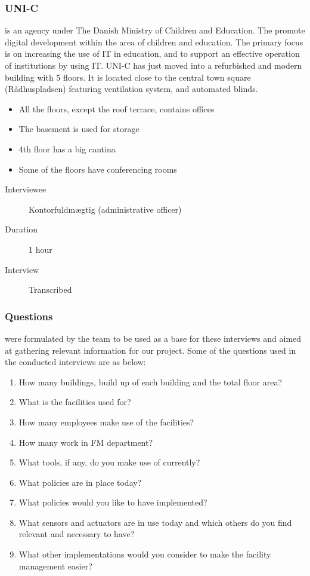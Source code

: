 \subsubsection{UNI-C} is an agency under The Danish Ministry of Children and Education. The promote digital development within the area of children and education. The primary focus is on increasing the use of IT in education, and to support an effective operation of institutions by using IT. UNI-C has just moved into a refurbished and modern building with 5 floors. It is located close to the central town square (R\aa dhuspladsen) featuring ventilation system, and automated blinds.
\begin{itemize}
	\item All the floors, except the roof terrace, contains offices
	\item The basement is used for storage
	\item 4th floor has a big cantina
	\item Some of the floors have conferencing rooms
\end{itemize}
\begin{description}
	\item[Interviewee] Kontorfuldmægtig (administrative officer)
	\item[Duration] 1 hour
	\item[Interview] Transcribed
\end{description}

\subsubsection{Questions} were formulated by the team to be used as a base for these interviews and aimed at gathering relevant information for our project. Some of the questions used in the conducted interviews are as below:
\begin{enumerate}
	\item How many buildings, build up of each building and the total floor area?
	\item What is the facilities used for? 
	\item How many employees make use of the facilities?
	\item How many work in FM department?
	\item What tools, if any, do you make use of currently?
	\item What policies are in place today?
	\item What policies would you like to have implemented?
	\item What sensors and actuators are in use today and which others do you find relevant and necessary to have?
	\item What other implementations would you consider to make the facility management easier?
\end{enumerate}

